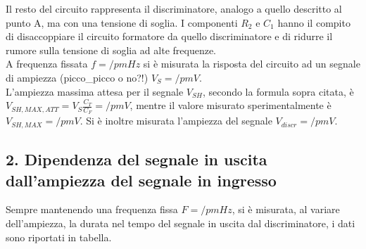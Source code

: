 \documentclass[10pt,a4paper]{article}
\begin{document}
Il resto del circuito rappresenta il discriminatore, analogo a quello descritto al punto A, ma con una tensione di soglia. I componenti $R_2$ e $C_1$ hanno il compito di disaccoppiare il circuito formatore da quello discriminatore e di ridurre il rumore sulla tensione di soglia ad alte frequenze.\\
A frequenza fissata $f = /pm Hz$ si è misurata la risposta del circuito ad un segnale di ampiezza (picco_picco o no?!) $V_S = /pm V$.\\
L'ampiezza massima attesa per il segnale $V_{SH}$, secondo la formula sopra citata, è $V_{SH,MAX,ATT} = V_S \frac{C_T}{C_F} =  /pm V$, mentre il valore misurato sperimentalmente è $V_{SH,MAX} = /pm V$.
Si è inoltre misurata l'ampiezza del segnale $V_{discr} = /pm V$.

\subsection*{2. Dipendenza del segnale in uscita dall'ampiezza del segnale in ingresso}

Sempre mantenendo una frequenza fissa $F = /pm Hz$, si è misurata, al variare dell'ampiezza, la durata nel tempo del segnale in uscita dal discriminatore, i dati sono riportati in tabella.\\
\end{document}
